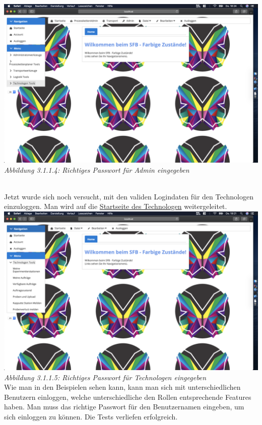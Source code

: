 \documentclass[enabledeprecatedfontcommands,fontsize=12pt,paper=a4,twoside]{scrartcl}
\begin{document}
\hypertarget{sc3.1.1.4}{
\includegraphics[width=1\textwidth]{Screenshots/311AdminView.png}
\textit{Abbildung 3.1.1.4: Richtiges Passwort für Admin eingegeben}
} \\

Jetzt wurde sich noch versucht, mit den validen Logindaten für den Technologen einzuloggen. Man wird auf die \hyperlink{sc3.1.1.5}{Startseite des Technologen} weitergeleitet. \\

\hypertarget{sc3.1.1.5}{
\includegraphics[width=1\textwidth]{Screenshots/311TechnologeView.png}
\textit{Abbildung 3.1.1.5: Richtiges Passwort für Technologen eingegeben}
} \\

Wie man in den Beispielen sehen kann, kann man sich mit unterschiedlichen Benutzern einloggen, welche unterschiedliche den Rollen entsprechende Features haben. Man muss das richtige Passwort für den Benutzernamen eingeben, um sich einloggen zu können. Die Tests verliefen erfolgreich. \\ 
\end{document}
